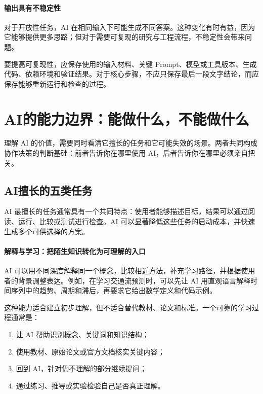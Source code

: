 \paragraph{输出具有不稳定性}

对于开放性任务，AI 在相同输入下可能生成不同答案。这种变化有时有益，因为它能够提供更多思路；但对于需要可复现的研究与工程流程，不稳定性会带来问题。

要提高可复现性，应保存使用的输入材料、关键 Prompt、模型或工具版本、生成代码、依赖环境和验证结果。对于核心步骤，不应只保存最后一段文字结论，而应保存能够重新运行和检查的过程。

\section{AI的能力边界：能做什么，不能做什么}

理解 AI 的价值，需要同时看清它擅长的任务和它可能失效的场景。两者共同构成协作决策的判断基础：前者告诉你在哪里使用 AI，后者告诉你在哪里必须亲自把关。

\subsection{AI擅长的五类任务}

AI 最擅长的任务通常具有一个共同特点：使用者能够描述目标，结果可以通过阅读、运行、比较或测试进行检查。AI 可以显著降低这些任务的启动成本，并快速生成多个可供选择的方案。

\paragraph{解释与学习：把陌生知识转化为可理解的入口}

AI 可以用不同深度解释同一个概念，比较相近方法，补充学习路径，并根据使用者的背景调整表达。例如，在学习交通流预测时，可以先让 AI 用直观语言解释时间序列中的趋势、周期和滞后，再要求它给出数学定义和代码示例。

这种能力适合建立初步理解，但不适合替代教材、论文和标准。一个可靠的学习过程通常是：

\begin{enumerate}
  \item 让 AI 帮助识别概念、关键词和知识结构；
  \item 使用教材、原始论文或官方文档核实关键内容；
  \item 回到 AI，针对仍不理解的部分继续提问；
  \item 通过练习、推导或实验检验自己是否真正理解。
\end{enumerate}

